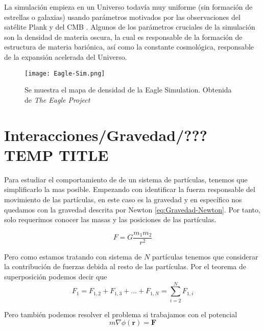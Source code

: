 La simulación empieza en un Universo todavía muy uniforme (sin formación de estrellas o galaxias) usando parámetros motivados por las observaciones del satélite Plank y del CMB \cite{ 2013ApJS..208...20B, 2020A&A...641A...1P}. Algunos de los parámetros cruciales de la simulación son la densidad de materia oscura, la cual es responsable de la formación de estructura de materia bariónica, así como la constante cosmológica, responsable de la expansión acelerada del Universo.
       
\begin{figure}[H]
    \centering
    \texttt{[image: Eagle-Sim.png]}
    \caption[Eagle Simulation Cosmic Web]{Se muestra el mapa de densidad de la Eagle Simulation. Obtenida de \textit{The Eagle Project} }
    \label{fig:Eagle_Sim}
\end{figure}


\section{Interacciones/Gravedad/??? TEMP TITLE}

Para estudiar el comportamiento de de un sistema de partículas, tenemos que simplificarlo la mas posible. Empezando con identificar la fuerza responsable del movimiento de las partículas, en este caso es la gravedad y en específico nos quedamos con la gravedad descrita por Newton \eqref{eq:Gravedad-Newton}. Por tanto, solo requerimos conocer las masas y las posiciones de las partículas.

\begin{equation}
    F = G \frac{m_1 m_2}{r^2}
    \label{eq:Gravedad-Newton}
\end{equation}

Pero como estamos tratando con sistema de $N$ partículas tenemos que considerar la contribución de fuerzas debida al resto de las partículas. Por el teorema de superposición podemos decir que
\begin{equation}
    F_{1} = F_{1,2} +F_{1,3} + \dots + F_{1,N} = \sum_{i=2}^{N} F_{1,i} 
    \label{eq:superposicion}
\end{equation}

Pero también podemos resolver el problema si trabajamos con el potencial
\begin{equation}
    m\nabla \phi(\mathbf{r}) = \mathbf{F}
    \label{eq:potencial-gravitacional}
\end{equation}

